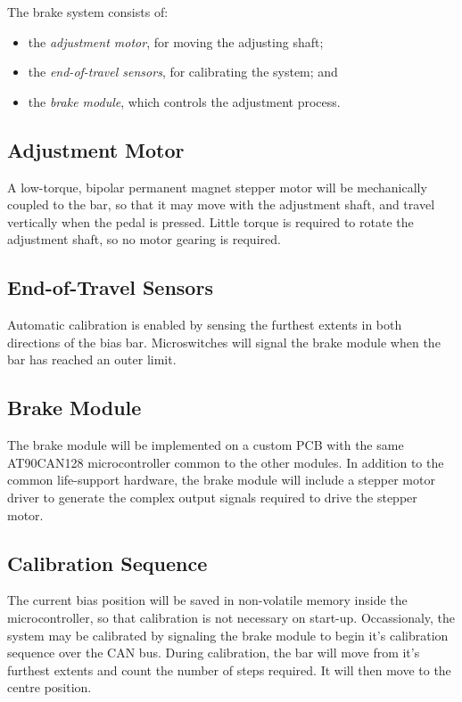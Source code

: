 The brake system consists of: 

\begin{itemize}
\item the \emph{adjustment motor}, for moving the adjusting shaft;
\item the \emph{end-of-travel sensors}, for calibrating the system; and
\item the \emph{brake module}, which controls the adjustment process.
\end{itemize}

\subsection{Adjustment Motor}

A low-torque, bipolar permanent magnet stepper motor will be mechanically coupled to the bar, so that it may move with the adjustment shaft, and travel vertically when the pedal is pressed. Little torque is required to rotate the adjustment shaft, so no motor gearing is required. 

\subsection{End-of-Travel Sensors}

Automatic calibration is enabled by sensing the furthest extents in both directions of the bias bar. Microswitches will signal the brake module when the bar has reached an outer limit. 

\subsection{Brake Module}

The brake module will be implemented on a custom PCB with the same AT90CAN128 microcontroller common to the other modules. In addition to the common life-support hardware, the brake module will include a stepper motor driver to generate the complex output signals required to drive the stepper motor.

\subsection{Calibration Sequence}

The current bias position will be saved in non-volatile memory inside the microcontroller, so that calibration is not necessary on start-up. Occassionaly, the system may be calibrated by signaling the brake module to begin it's calibration sequence over the CAN bus. During calibration, the bar will move from it's furthest extents and count the number of steps required. It will then move to the centre position.

